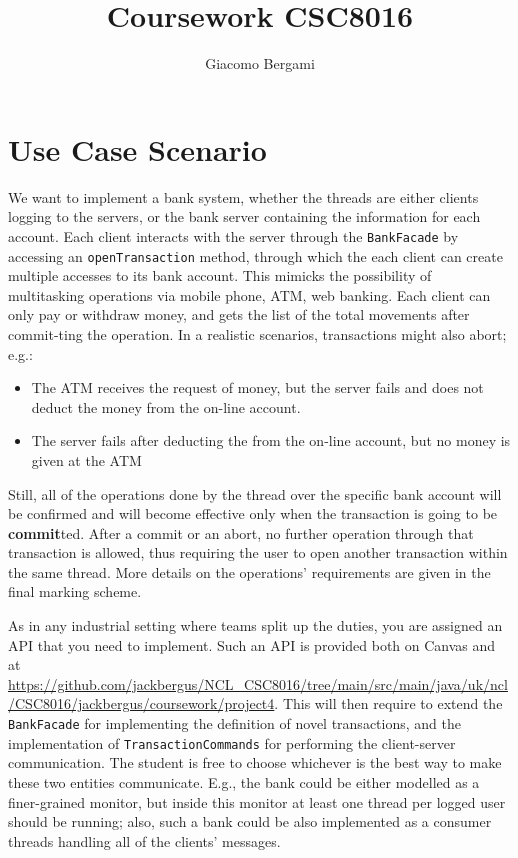 \documentclass{article}
\title{Coursework CSC8016}
\author{Giacomo Bergami}
\begin{document}
	\maketitle
	
	\section*{Use Case Scenario}
We want to implement a bank system, whether the threads are
either clients logging to the servers, or the bank server containing
the information for each account. Each client interacts with the server through the \texttt{BankFacade} by accessing an \texttt{openTransaction} method, through which the each client can create multiple accesses to its bank account. This mimicks the possibility of multitasking operations via mobile phone, ATM, web banking. Each client can only \textsf{pay} or \textsf{withdraw} money, and gets the list of the total movements after \textsf{commit}-ting the operation. In a realistic scenarios, transactions might also \textsf{abort}; e.g.:
\begin{itemize}
\item The ATM receives the request of money, but the server fails and does
not deduct the money from the on-line account.
\item The server fails after deducting the from the on-line account, but no
money is given at the ATM
\end{itemize}
Still, all of the operations done by the thread over the specific bank account will be confirmed and will become effective only when the transaction is going to be \textbf{commit}ted. After a commit or an abort, no further operation through that transaction is allowed, thus requiring the user to open another transaction within the same thread. More details on the operations' requirements are given in the final marking scheme.


As in any industrial setting where teams split up the duties,
you are assigned an API that you need to implement. Such an API is provided both on Canvas and at \url{https://github.com/jackbergus/NCL_CSC8016/tree/main/src/main/java/uk/ncl/CSC8016/jackbergus/coursework/project4}. This will then require to extend the \texttt{BankFacade} for implementing the definition of novel transactions, and the implementation of \texttt{TransactionCommands} for performing the client-server communication. The student is free to choose whichever is the best way to make these two entities communicate. E.g., the bank could be either modelled as a finer-grained monitor, but inside this monitor at least one thread per logged user should be running; also, such a bank could be also implemented as a consumer threads handling all of the clients' messages. 
\end{document}
